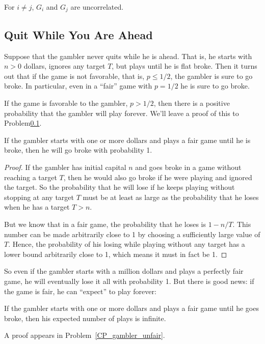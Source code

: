 \begin{lemma}\label{LN12:Guncor}
For $i \neq j$, $G_i$ and $G_j$ are uncorrelated.
\end{lemma}
\fi


\subsection{Quit While You Are Ahead}

Suppose that the gambler never quits while he is ahead.  That is, he
starts with $n>0$ dollars, ignores any target $T$, but plays until he is
flat broke.  Then it turns out that if the game is not favorable, that
is, $p \leq 1/2$, the gambler is sure to go broke.  In particular, even
in a ``fair'' game with $p = 1/2$ he is sure to go broke.

\begin{editingnotes}
If the game is favorable to the gambler, \ie $p>1/2$, then there is a
positive probability that the gambler will play forever.  We'll leave
a proof of this to Problem\ref{}.
\end{editingnotes}

\begin{lemma}\label{LN12:go broke}
If the gambler starts with one or more dollars and plays a fair game until
he is broke, then he will go broke with probability 1.
\end{lemma}

\begin{proof}
If the gambler has initial capital $n$ and goes broke in a game without
reaching a target $T$, then he would also go broke if he were playing and
ignored the target.  So the probability that he will lose if he keeps
playing without stopping at any target $T$ must be at least as large as the
probability that he loses when he has a target $T>n$.

But we know that in a fair game, the probability that he loses is $1 -
n/T$.  This number can be made arbitrarily close to 1 by choosing a
sufficiently large value of $T$.  Hence, the probability of his losing
while playing without any target has a lower bound arbitrarily close to 1,
which means it must in fact be 1.
\end{proof}

So even if the gambler starts with a million dollars and plays a
perfectly fair game, he will eventually lose it all with probability
1.  But there is good news: if the game is fair, he can ``expect'' to
play forever:

\begin{lemma}\label{LN12:play forever}
If the gambler starts with one or more dollars and plays a fair game until
he goes broke, then his expected number of plays is infinite.
\end{lemma}
A proof appears in Problem~\ref{CP_gambler_unfair}.

